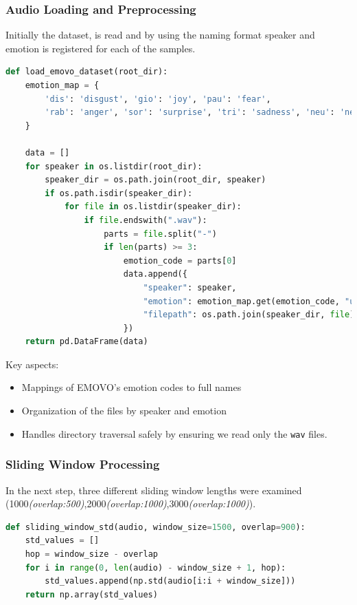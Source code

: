 \documentclass[12pt]{ieeetj}
\begin{document}
\subsubsection{Audio Loading and Preprocessing}
Initially the dataset, is read and by using the naming format speaker and emotion is
registered for each of the samples.
\begin{lstlisting}[language=Python]
def load_emovo_dataset(root_dir):
    emotion_map = {
        'dis': 'disgust', 'gio': 'joy', 'pau': 'fear',
        'rab': 'anger', 'sor': 'surprise', 'tri': 'sadness', 'neu': 'neutral'
    }
    
    data = []
    for speaker in os.listdir(root_dir):
        speaker_dir = os.path.join(root_dir, speaker)
        if os.path.isdir(speaker_dir):
            for file in os.listdir(speaker_dir):
                if file.endswith(".wav"):
                    parts = file.split("-")
                    if len(parts) >= 3:
                        emotion_code = parts[0]
                        data.append({
                            "speaker": speaker,
                            "emotion": emotion_map.get(emotion_code, "unknown"),
                            "filepath": os.path.join(speaker_dir, file)
                        })
    return pd.DataFrame(data)
\end{lstlisting}

Key aspects:
\begin{itemize}
    \item Mappings of EMOVO's emotion codes to full names
    \item Organization of the files by speaker and emotion
    \item Handles directory traversal safely by ensuring we read only the \texttt{wav} files.
\end{itemize}

\subsubsection{Sliding Window Processing}

In the next step, three different sliding window lengths were examined (1000\textit{(overlap:500)},2000\textit{(overlap:1000)},3000\textit{(overlap:1000)}).

\begin{lstlisting}[language=Python]
def sliding_window_std(audio, window_size=1500, overlap=900):
    std_values = []
    hop = window_size - overlap
    for i in range(0, len(audio) - window_size + 1, hop):
        std_values.append(np.std(audio[i:i + window_size]))
    return np.array(std_values)
\end{lstlisting}
\end{document}
